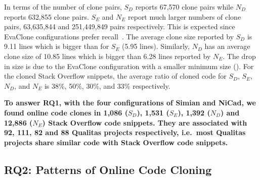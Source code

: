 \documentclass[sigconf,review, anonymous]{acmart}
\begin{document}

In terms of the number of clone pairs, $S_D$ reports 67,570 clone
pairs while $N_D$ reports 632,855 clone pairs. $S_E$ and $N_E$ report
much larger numbers of clone pairs, 63,635,844 and 251,449,849 pairs
respectively. This is expected since EvaClone configurations prefer
recall~\cite{Wang2013}.
The average clone size reported by $S_D$ is 9.11 lines which is bigger
than for $S_E$ (5.95 lines). Similarly, $N_D$ has an average clone
size of 10.85 lines which is bigger than 6.28 lines reported by
$N_E$. The drop in size is due to the EvaClone configuration with a
smaller minimum size (). For the cloned Stack
Overflow snippets, the average ratio of cloned code for $S_D$, $S_E$,
$N_D$, and $N_E$ is 38\%, 50\%, 30\%, and 33\% respectively.


\textbf{To answer RQ1, with the four configurations of Simian and
  NiCad, we found online code clones in 1,086 ($S_D$), 1,531 ($S_E$),
  1,392 ($N_D$) and 12,886 ($N_E$) Stack Overflow code snippets. They
  are associated with 92, 111, 82 and 88 Qualitas projects
  respectively, i.e.~most Qualitas projects share similar code with
  Stack Overflow code snippets.}


\subsection{RQ2: Patterns of Online Code Cloning}
\end{document}
